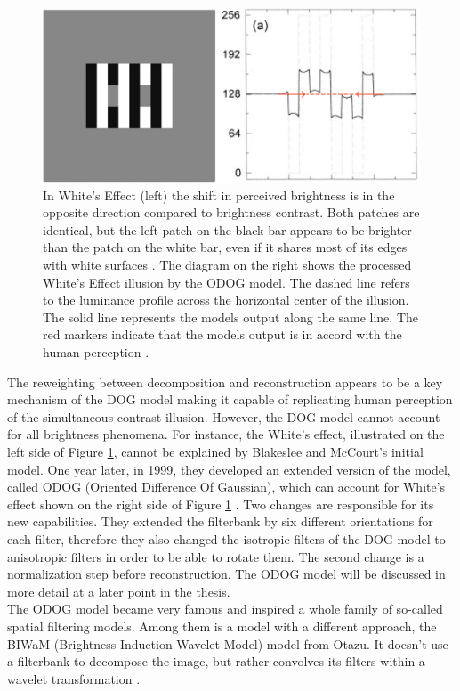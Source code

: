 \newpage

\begin{figure}[H]
    \centering
    \includegraphics[width=0.7\linewidth]{media/whites_effect_model.png}
    \begin{minipage}{0.8\textwidth}
    \caption[Models response to White's Effect]{In White's Effect (left) the shift in
    perceived brightness is in the opposite direction compared to brightness contrast.
    Both patches are identical, but the left patch on the black bar appears to be brighter
    than the patch on the white bar, even if it shares most of its edges with white
    surfaces \parencite{Whit1979}. The diagram on the right shows the processed White's
    Effect illusion by the ODOG model. The dashed line refers to the luminance profile
    across the horizontal center of the illusion. The solid line represents the models
    output along the same line. The red markers indicate that the models output is in
    accord with the human perception \parencite{Blakeslee1999}.}
    \label{fig:figure6}
    \end{minipage}
\end{figure}

The reweighting between decomposition and reconstruction appears to be a key mechanism of
the DOG model making it capable of replicating human perception of the simultaneous
contrast illusion. However, the DOG model cannot account for all brightness phenomena. For
instance, the White's effect, illustrated on the left side of Figure \ref{fig:figure6},
cannot be explained by Blakeslee and McCourt's initial model. One year later, in 1999,
they developed an extended version of the model, called ODOG (Oriented Difference Of
Gaussian), which can account for White's effect shown on the right side of Figure
\ref{fig:figure6} \parencite{Blakeslee1999}. Two changes are responsible for its new
capabilities. They extended the filterbank by six different orientations for each filter,
therefore they also changed the isotropic filters of the DOG model to anisotropic filters
in order to be able to rotate them. The second change is a normalization step before
reconstruction. The ODOG model will be discussed in more detail at a later point in the
thesis. \\
The ODOG model became very famous and inspired a whole family of so-called spatial
filtering models. Among them is a model with a different approach, the BIWaM (Brightness
Induction Wavelet Model) model from Otazu. It doesn't use a filterbank to decompose the
image, but rather convolves its filters within a wavelet transformation
\parencite{Otazu2008}.


